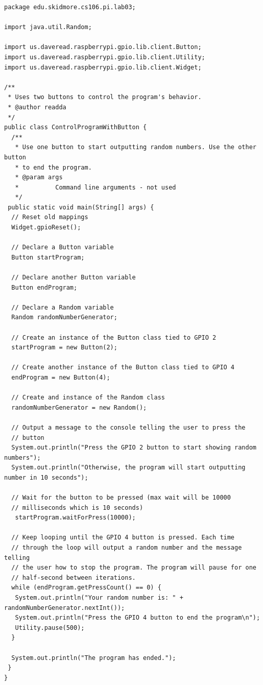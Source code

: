 \beforeverb
\begin{verbatim}
package edu.skidmore.cs106.pi.lab03;

import java.util.Random;

import us.daveread.raspberrypi.gpio.lib.client.Button;
import us.daveread.raspberrypi.gpio.lib.client.Utility;
import us.daveread.raspberrypi.gpio.lib.client.Widget;

/**
 * Uses two buttons to control the program's behavior.
 * @author readda
 */
public class ControlProgramWithButton {
  /**
   * Use one button to start outputting random numbers. Use the other button
   * to end the program.
   * @param args
   *          Command line arguments - not used
   */
 public static void main(String[] args) {
  // Reset old mappings
  Widget.gpioReset();

  // Declare a Button variable
  Button startProgram;

  // Declare another Button variable
  Button endProgram;

  // Declare a Random variable
  Random randomNumberGenerator;

  // Create an instance of the Button class tied to GPIO 2
  startProgram = new Button(2);

  // Create another instance of the Button class tied to GPIO 4
  endProgram = new Button(4);

  // Create and instance of the Random class
  randomNumberGenerator = new Random();

  // Output a message to the console telling the user to press the
  // button
  System.out.println("Press the GPIO 2 button to start showing random numbers");
  System.out.println("Otherwise, the program will start outputting number in 10 seconds");

  // Wait for the button to be pressed (max wait will be 10000
  // milliseconds which is 10 seconds)
   startProgram.waitForPress(10000);

  // Keep looping until the GPIO 4 button is pressed. Each time
  // through the loop will output a random number and the message telling
  // the user how to stop the program. The program will pause for one
  // half-second between iterations.
  while (endProgram.getPressCount() == 0) {
   System.out.println("Your random number is: " + randomNumberGenerator.nextInt());
   System.out.println("Press the GPIO 4 button to end the program\n");
   Utility.pause(500);
  }

  System.out.println("The program has ended.");
 }
}
\end{verbatim}
\afterverb

